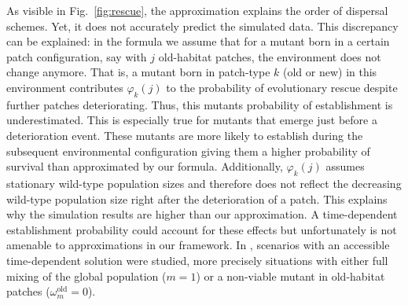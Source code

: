 \documentclass[a4paper,11pt]{article}
\newcommand{\chg}[1]{\textcolor{change}{#1}}
\begin{document}
As visible in Fig.~\ref{fig:rescue}, the approximation explains the \chg{order of dispersal schemes}. Yet, it does not accurately predict the simulated data. This discrepancy can be explained: in the formula we \chg{assume that for a mutant born in a certain patch configuration, say with $j$ old-habitat patches, the environment does not change anymore. That is, a mutant born in patch-type $k$ (old or new) in this environment contributes $\varphi_{k}(j)$ to the probability of evolutionary rescue despite further patches deteriorating. Thus, this mutants probability of establishment is underestimated. This is especially true for mutants that emerge just before a deterioration event. These mutants are more likely to establish during the subsequent environmental configuration giving them a higher probability of survival than approximated by our formula. Additionally, $\varphi_k(j)$ assumes stationary wild-type population sizes and therefore does not reflect the decreasing wild-type population size right after the deterioration of a patch.} 
This explains why the simulation results are higher than our approximation. 
\chg{A time-dependent establishment probability could account for these effects but unfortunately is not amenable to approximations in our framework.}
\chg{In \citet{uecker_2014}, scenarios with an accessible time-dependent solution were studied, more precisely situations with either full mixing of the global population ($m=1$) or a non-viable mutant in old-habitat patches ($\omega^\text{old}_m=0$).}
\end{document}
